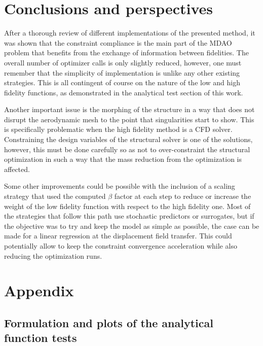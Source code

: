 \documentclass[conf]{new-aiaa}
\begin{document}
\section{Conclusions and perspectives}
\label{sec:conclusions}
After a thorough review of different implementations of the presented method, it was shown that the constraint compliance is the main part of the MDAO problem that benefits from the exchange of information between fidelities. The overall number of optimizer calls is only slightly reduced, however, one must remember that the simplicity of implementation is unlike any other existing strategies. This is all contingent of course on the nature of the low and high fidelity functions, as demonstrated in the analytical test section of this work. \par
Another important issue is the morphing of the structure in a way that does not disrupt the aerodynamic mesh to the point that singularities start to show. This is specifically problematic when the high fidelity method is a CFD solver. Constraining the design variables of the structural solver is one of the solutions, however, this must be done carefully so as not to over-constraint the structural optimization in such a way that the mass reduction from the optimization is affected. \par
Some other improvements could be possible with the inclusion of a scaling strategy that used the computed $\beta$ factor at each step to reduce or increase the weight of the low fidelity function with respect to the high fidelity one. Most of the strategies that follow this path use stochastic predictors or surrogates, but if the objective was to try and keep the model as simple as possible, the case can be made for a linear regression at the displacement field transfer. This could potentially allow to keep the constraint convergence acceleration while also reducing the optimization runs.


\section*{Appendix}

\subsection{Formulation and plots of the analytical function tests}
\label{subsec:formulplots}
\end{document}
